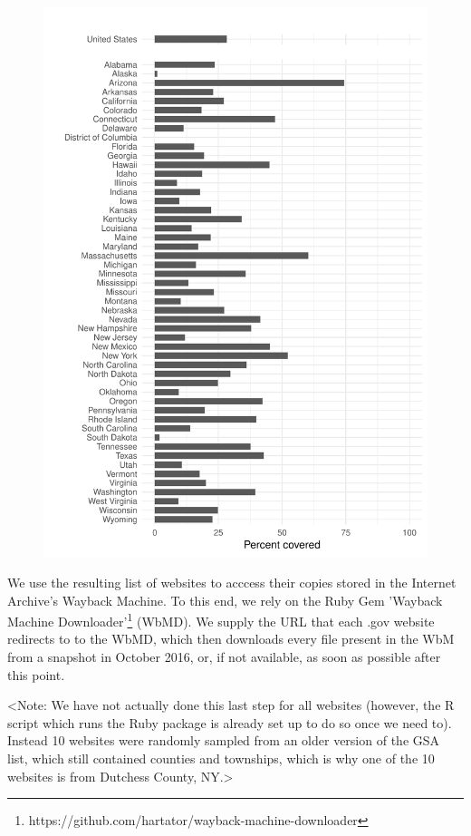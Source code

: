 \documentclass[11pt]{article}
\begin{document}
\begin{figure}[!ht]
	\centering
	\includegraphics[width=0.9\linewidth,height=0.9\textheight]{figures/coverage_states.pdf}
\end{figure}

We use the resulting list of websites to acccess their copies stored in the Internet Archive's Wayback Machine. To this end, we rely on the Ruby Gem 'Wayback Machine Downloader'\footnote{https://github.com/hartator/wayback-machine-downloader} (WbMD). We supply the URL that each .gov website redirects to to the WbMD, which then downloads every file present in the WbM from a snapshot in October 2016, or, if not available, as soon as possible after this point.

<Note: We have not actually done this last step for all websites (however, the R script which runs the Ruby package is already set up to do so once we need to). Instead 10 websites were randomly sampled from an older version of the GSA list, which still contained counties and townships, which is why one of the 10 websites is from Dutchess County, NY.>
\end{document}
